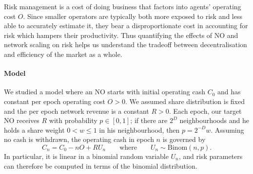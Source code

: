 Risk management is a cost of doing business that factors into agents' operating cost $O$.
%
Since smaller operators are typically both more exposed to risk and less able to accurately estimate it, they bear a disproportionate cost in accounting for risk which hampers their productivity.
%
Thus quantifying the effects of NO and network scaling on risk helps us understand the tradeoff between decentralisation and efficiency of the market as a whole.

\begin{comment}
\subsubsection*{Redistribution lottery structure}
 
A risk factor that is straightforwardly under the direct control of the system is the structure of the redistribution lottery.
%
Currently, in each epoch the full redistribution payout is awarded to a single NO with probability weighted by the number of bins and the NO share within the target bin.
%
Clearly, such an approach has higher variance than the expectation-equivalent deterministic system, which doles out a share of the payout weighted by the number of bins and bin share with probability $1$.

The random approach saves on computational costs by reducing the number of transfers that must be made in each epoch.
%
On the other hand, it introduces a risk of drawdowns and bankruptcy that especially affects smaller scale NOs, who may experience long strings of epochs without receiving any payout.
\end{comment}

\paragraph{Model}

We studied a model where an NO starts with initial operating cash $C_0$ and has constant per epoch operating cost $O>0$.
%
We assumed share distribution is fixed and the per epoch network revenue is a constant $R>0$.
%
Each epoch, our target NO receives $R$ with probability $p\in[0,1]$; if there are $2^D$ neighbourhoods and he holds a share weight $0<w\leq 1$ in his neighbourhood, then $p=2^{-D}w$.
%
Assuming no cash is withdrawn, the operating cash in epoch $n$ is governed by
\[
  C_n = C_0 - nO + RU_n \qquad\text{where}\qquad U_n\sim \mathrm{Binom}(n,p).
\]
In particular, it is linear in a binomial random variable $U_n$, and risk parameters can therefore be computed in terms of the binomial distribution.

